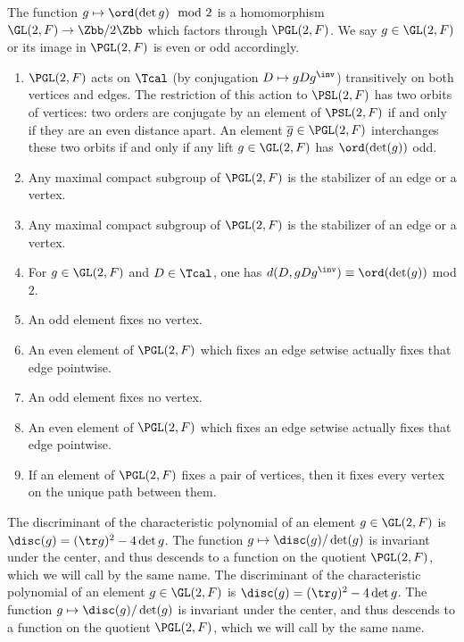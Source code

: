 \documentclass[draft]{amsart}
\begin{document}
The function $g \mapsto \ord(\det g) \mod 2 $ is a homomorphism $\GL(2,F) \to \Zbb/2\Zbb$ which factors through $\PGL(2,F)$. We say $g\in \GL(2,F)$ or its image in $\PGL(2,F)$ is even or odd accordingly.

\begin{proposition}
    \begin{enumerate}
        \item $\PGL(2,F)$ acts on $\Tcal$ (by conjugation $D\mapsto gDg^\inv$) transitively on both vertices and edges. The restriction of this action to $\PSL(2,F)$ has two orbits of vertices: two orders are conjugate by an element of $\PSL(2,F)$ if and only if they are an even distance apart. An element $\overline{g} \in \PGL(2,F)$ interchanges these two orbits if and only if any lift $g \in \GL(2,F)$ has $\ord(\det(g))$ odd.
        \item Any maximal compact subgroup of $\PGL(2,F)$ is the stabilizer of an edge or a vertex.
        \item Any maximal compact subgroup of $\PGL(2,F)$ is the stabilizer of an edge or a vertex.
        \item For $g \in \GL(2,F)$ and $D\in \Tcal$, one has $d(D,g D g^\inv) \equiv \ord(\det (g))$ mod $2$.
        \item An odd element fixes no vertex.
        \item An even element of $\PGL(2,F)$ which fixes an edge setwise actually fixes that edge pointwise.
        \item An odd element fixes no vertex.
        \item An even element of $\PGL(2,F)$ which fixes an edge setwise actually fixes that edge pointwise.
        \item If an element of $\PGL(2,F)$ fixes a pair of vertices, then it fixes every vertex on the unique path between them.
    \end{enumerate}
\end{proposition}

The discriminant of the characteristic polynomial of an element $g\in \GL(2,F)$ is $\disc(g) =(\tr g)^2 - 4 \det g$. The function $g \mapsto \disc(g)/\det(g)$ is invariant under the center, and thus descends to a function on the quotient $\PGL(2,F)$, which we will call by the same name.
The discriminant of the characteristic polynomial of an element $g\in \GL(2,F)$ is $\disc(g) =(\tr g)^2 - 4 \det g$. The function $g \mapsto \disc(g)/\det(g)$ is invariant under the center, and thus descends to a function on the quotient $\PGL(2,F)$, which we will call by the same name.
\end{document}
